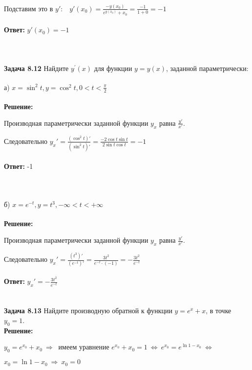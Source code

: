 \documentclass[12pt]{article}
\begin{document}
    \\
    \par Подставим это в $y'$: $\ \ \ y'(x_0) = \frac{-y(x_0)}{e^{y(x_0)} + x_0} = \frac{-1}{1 + 0} = -1$
    \\
    \\ \textbf{Ответ: } $y'(x_0) = -1$
    \\
    \\ \\ \\
    {\large \bf Задача 8.12} Найдите $y^{'}(x)$ для функции $y = y(x)$, заданной параметрически:
    \\
    \\ а) $x = \sin^2{t}, y = \cos^2{t}, 0 < t < \frac{\pi}{2}$\\
    \\ \textbf{Решение: }
    \par Производная параметрически заданной функции $y_x$ равна $\frac{y'}{x'}$.
    \\
    \par Следовательно $y_x' = \frac{(\cos^2{t})'}{(\sin^2 t)'} = \frac{-2\cos{t}\sin{t}}{2\sin{t}\cos{t}} = -1$
    \\
    \\ \textbf{Ответ: } -1
    \\ \\ \\
    \\ б) $x = e^{-t}, y = t^3, -\infty < t < +\infty$\\
    \\ \textbf{Решение: }
    \par Производная параметрически заданной функции $y_x$ равна $\frac{y'}{x'}$.
    \\
    \par Следовательно $y_x' = \frac{(t^3)'}{(e^{-t})'} = \frac{3t^2}{e^{-t} \cdot (-1)} = -\frac{3t^2}{e^{-t}}$
    \\
    \\ \textbf{Ответ: } $y_x' = -\frac{3t^2}{e^{-t}}$
    \\ \\ \\
    {\large \bf Задача 8.13} Найдите производную обратной к функции $y = e^x + x$, в точке $y_0 = 1$.
    \\ \textbf{Решение: }
    \par $y_0 = e^{x_0} + x_0 \ \Rightarrow \ $ имеем уравнение $e^{x_0} + x_0 = 1 \ \Longleftrightarrow \ e^{x_0} = e^{\ln{1 - x_0}} \ \Longleftrightarrow $ \par $x_0 = \ln{1 - x_0} \ \Rightarrow \ x_0 = 0$
\end{document}
